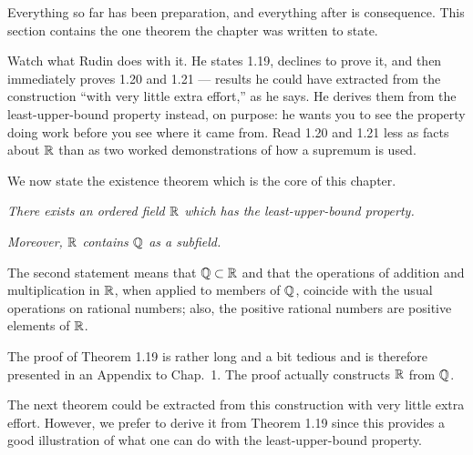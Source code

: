 \documentclass[11pt,twoside]{article}
\begin{document}


\begin{signpost}
Everything so far has been preparation, and everything after is consequence.
This section contains the one theorem the chapter was written to state.

\smallskip
Watch what Rudin does with it. He states 1.19, declines to prove it, and then
immediately proves 1.20 and 1.21 --- results he could have extracted from the
construction ``with very little extra effort,'' as he says. He derives them from
the least-upper-bound property instead, on purpose: he wants you to see the
property doing work before you see where it came from. Read 1.20 and 1.21 less
as facts about $\mathbb{R}$ than as two worked demonstrations of how a supremum is
used.
\end{signpost}

\noindent
We now state the existence theorem which is the core of this chapter.

\emph{There exists an ordered field $\mathbb{R}$ which has the least-upper-bound
property.}

\emph{Moreover, $\mathbb{R}$ contains $\mathbb{Q}$ as a subfield.}

The second statement means that $\mathbb{Q} \subset \mathbb{R}$ and that the operations of
addition and multiplication in $\mathbb{R}$, when applied to members of $\mathbb{Q}$, coincide
with the usual operations on rational numbers; also, the positive rational
numbers are positive elements of $\mathbb{R}$.

The proof of Theorem 1.19 is rather long and a bit tedious and is therefore
presented in an Appendix to Chap.\ 1. The proof actually constructs $\mathbb{R}$ from
$\mathbb{Q}$.

The next theorem could be extracted from this construction with very little
extra effort. However, we prefer to derive it from Theorem 1.19 since this
provides a good illustration of what one can do with the least-upper-bound
property.
\end{document}
